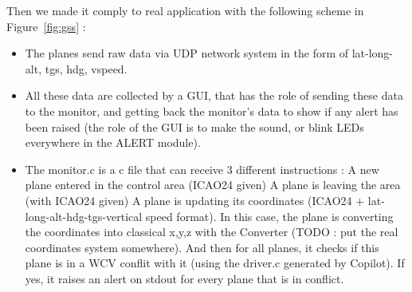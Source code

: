 Then we made it comply to real application with the following scheme in Figure~\ref{fig:gss} :
\begin{itemize}
	\item The planes send raw data via UDP network system in the form of lat-long-alt, tgs, hdg, vspeed.
	\item All these data are collected by a GUI, that has the role of sending these data to the monitor, and getting back the monitor's data to show if any alert has been raised (the role of the GUI is to make the sound, or blink LEDs everywhere in the ALERT module).
	\item The monitor.c is a c file that can receive 3 different instructions :
	\subitem A new plane entered in the control area (ICAO24 given)
	\subitem A plane is leaving the area (with ICAO24 given)
	\subitem A plane is updating its coordinates (ICAO24 + lat-long-alt-hdg-tgs-vertical speed format). In this case, the plane is converting the coordinates into classical x,y,z with the Converter (TODO : put the real coordinates system somewhere). And then for all planes, it checks if this plane is in a WCV conflit with it (using the driver.c generated by Copilot). If yes, it raises an alert on stdout for every plane that is in conflict. 
\end{itemize}

